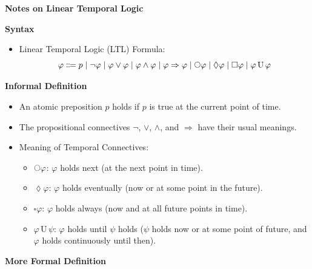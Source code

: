 \documentclass[12pt]{article}
\newcommand{\imp}{\Rightarrow}
\newcommand{\until}{\,\mathrm{U}\,}
\newcommand{\iscircle}{\mathord{\scalerel*{\bigcirc}{\square}}}
\begin{document}
    \begin{center}
        {\large\bf Notes on Linear Temporal Logic} \\
    \end{center}

    \textbf{Syntax}

    \begin{itemize}
        \item Linear Temporal Logic (LTL) Formula:
        $$
            \varphi \Coloneqq p \mid \neg\varphi \mid \varphi\lor\varphi \mid \varphi\land\varphi \mid \varphi\imp\varphi \mid \iscircle\varphi \mid \lozenge\varphi \mid \square\varphi \mid \varphi \until \varphi
        $$
    \end{itemize}
    
    \textbf{Informal Definition}

    \begin{itemize}
        \item An atomic preposition $p$ holds if $p$ is true at the current point of time.
        \item The propositional connectives $\neg$, $\lor$, $\land$, and $\imp$ have their usual meanings.
        \item Meaning of Temporal Connectives:
        \begin{itemize}
            \item $\iscircle \varphi$: $\varphi$ holds next (at the next point in time).
            \item $\lozenge \varphi$: $\varphi$ holds eventually (now or at some point in the future).
            \item $\square \varphi$: $\varphi$ holds always (now and at all future points in time).
            \item $\varphi \until \psi$: $\varphi$ holds until $\psi$ holds ($\psi$ holds now or at some point of future, and $\varphi$ holds continuously until then).
        \end{itemize}
    \end{itemize}

    \textbf{More Formal Definition}
\end{document}
